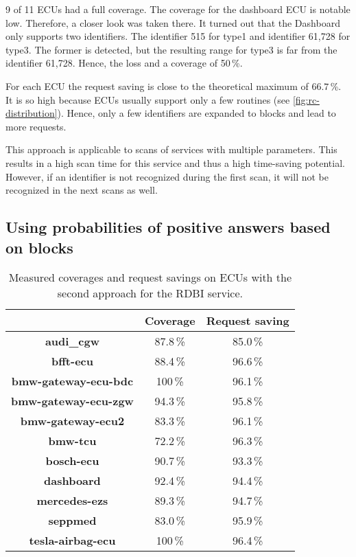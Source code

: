9 of 11 ECUs had a full coverage. The coverage for the dashboard ECU is notable low. Therefore, a closer look was taken there. It turned out that the Dashboard only supports two identifiers. The identifier 515 for type1 and identifier 61,728 for type3. The former is detected, but the resulting range for type3 is far from the identifier 61,728. Hence, the loss and a coverage of 50\,\%.

For each ECU the request saving is close to the theoretical maximum of $66.7$\,\%. It is so high because ECUs usually support only a few routines (see \autoref{fig:rc-distribution}). Hence, only a few identifiers are expanded to blocks and lead to more requests.

This approach is applicable to scans of services with multiple parameters. This results in a high scan time for this service and thus a high time-saving potential. However, if an identifier is not recognized during the first scan, it will not be recognized in the next scans as well.


\subsection{Using probabilities of positive answers based on blocks}

\begin{table}[H]
    \begin{center}
    \begin{tabular}{ccc}
        \hline
        & \textbf{Coverage} & \textbf{Request saving} \\
        \hline
        \textbf{audi\_cgw} & 87.8\,\% & 85.0\,\% \\
        \textbf{bfft-ecu} & 88.4\,\% & 96.6\,\% \\
        \textbf{bmw-gateway-ecu-bdc} & 100\,\% & 96.1\,\% \\
        \textbf{bmw-gateway-ecu-zgw} & 94.3\,\% & 95.8\,\% \\
        \textbf{bmw-gateway-ecu2} & 83.3\,\% & 96.1\,\% \\
        \textbf{bmw-tcu} & 72.2\,\% & 96.3\,\% \\
        \textbf{bosch-ecu} & 90.7\,\% & 93.3\,\% \\
        \textbf{dashboard} & 92.4\,\% & 94.4\,\% \\
        \textbf{mercedes-ezs} & 89.3\,\% & 94.7\,\% \\
        \textbf{seppmed} & 83.0\,\% & 95.9\,\% \\
        \textbf{tesla-airbag-ecu} & 100\,\% & 96.4\,\% \\
        \hline
    \end{tabular}
    \end{center}
    \caption{Measured coverages and request savings on ECUs with the second approach for the RDBI service.}
    \label{tab:evaluation-approach2}
\end{table}

